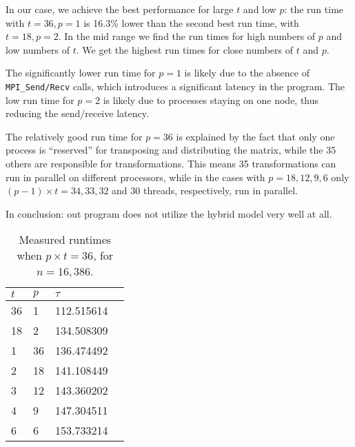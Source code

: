 In our case, we achieve the best performance for large $t$ and low $p$: the run time with $t=36, p=1$ is 16.3\% lower than the second best run time, with $t=18, p=2$. In the mid range we find the run times for high numbers of $p$ and low numbers of $t$. We get the highest run times for close numbers of $t$ and $p$.

The significantly lower run time for $p=1$ is likely due to the absence of \texttt{MPI\_Send/Recv} calls, which introduces a significant latency in the program.
The low run time for $p=2$ is likely due to processes staying on one node, thus reducing the send/receive latency.

The relatively good run time for $p=36$ is explained by the fact that only one process is ``reserved'' for transposing and distributing the matrix, while the 35 others are responsible for transformations. This means 35 transformations can run in parallel on different processors, while in the cases with $p=18,12,9,6$ only $(p-1)\times t = 34, 33, 32$ and $30$ threads, respectively, run in parallel.

In conclusion: out program does not utilize the hybrid model very well at all.



\begin{table}[H]
  \centering
  \caption{Measured runtimes when $p\times t = 36$, for $n=16,386$.}
  \label{tab:runtimes_36}
  \begin{tabularx}{0.5\textwidth}{XXXX}
    \toprule
    $t$ & $p$ & $\tau$ \\
    \midrule
    36  &  1  &  112.515614 \\
    18  &  2  &  134.508309 \\
    1   & 36  &  136.474492 \\
    2   & 18  &  141.108449 \\
    3   & 12  &  143.360202 \\
    4   &  9  &  147.304511 \\
    6   &  6  &  153.733214 \\
    \bottomrule
  \end{tabularx}
\end{table}

